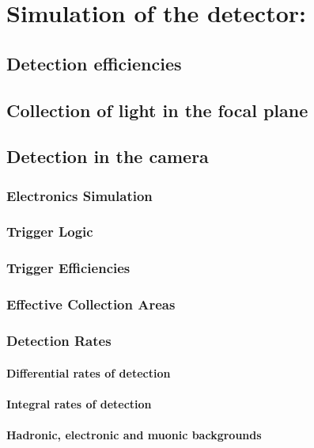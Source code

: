 

\chapter{Simulation of the detector: \MAGIC}
\label{chapter:magicsim}

\section{Detection efficiencies}

\section{Collection of light in the focal plane}

\section{Detection in the camera}

\subsection{Electronics Simulation}

\subsection{Trigger Logic}

\subsection{Trigger Efficiencies}

\subsection{Effective Collection Areas}

\subsection{Detection Rates}

\subsubsection{Differential rates of detection}

\subsubsection{Integral rates of detection}

\subsubsection{Hadronic, electronic and muonic backgrounds}

\endinput
%


